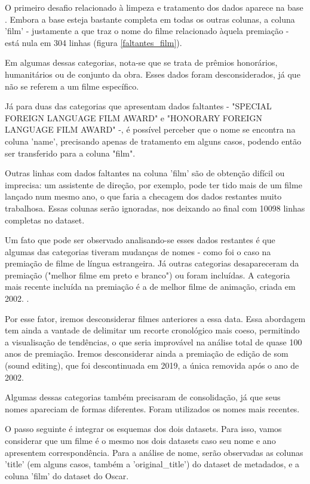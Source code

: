        O primeiro desafio relacionado à limpeza e tratamento dos dados aparece na base . Embora a base esteja bastante completa em todas os outras colunas, a coluna 'film' - justamente a que traz o nome do filme relacionado àquela premiação - está nula em 304 linhas  (figura \ref{faltantes_film}).

        Em algumas dessas categorias, nota-se que se trata de prêmios honorários, humanitários ou de conjunto da obra. Esses dados foram desconsiderados, já que não se referem a um filme específico.

        Já para duas das categorias que apresentam dados faltantes - "SPECIAL FOREIGN LANGUAGE FILM AWARD"
        e "HONORARY FOREIGN LANGUAGE FILM AWARD" -, é possível perceber que o nome se encontra na coluna 'name', precisando apenas de tratamento em alguns casos, podendo então ser transferido para a coluna "film".

        Outras linhas com dados faltantes na coluna 'film' são de obtenção difícil ou imprecisa: um assistente de direção, por exemplo, pode ter tido mais de um filme lançado num mesmo ano, o que faria a checagem dos dados restantes muito trabalhosa. Essas colunas serão ignoradas, nos deixando ao final com 10098 linhas completas no dataset.

        Um fato que pode ser observado analisando-se esses dados restantes é que algumas das categorias tiveram mudanças de nomes - como foi o caso na premiação de filme de língua estrangeira. Já outras categorias desapareceram da premiação ("melhor filme em preto e branco") ou foram incluídas. A categoria mais recente incluída na premiação é a de melhor filme de animação, criada em 2002. \cite{usatoday2002}.

        Por esse fator, iremos desconsiderar filmes anteriores a essa data. Essa abordagem tem ainda a vantade de delimitar um recorte cronológico mais coeso, permitindo a visualisação de tendências, o que seria improvável na análise total de quase 100 anos de premiação. Iremos desconsiderar ainda a premiação de edição de som (sound editing), que foi descontinuada em 2019, a única removida após o ano de 2002.\cite{deadline2020}

        Algumas dessas categorias também precisaram de consolidação, já que seus nomes apareciam de formas diferentes. Foram utilizados os nomes mais recentes.

        O passo seguinte é integrar os esquemas dos dois datasets. Para isso, vamos considerar que um filme é o mesmo nos dois datasets caso seu nome e ano apresentem correspondência. Para a análise de nome, serão observadas as colunas 'title' (em alguns casos, também a 'original\_title') do dataset de metadados, e a coluna 'film' do dataset do Oscar. 

